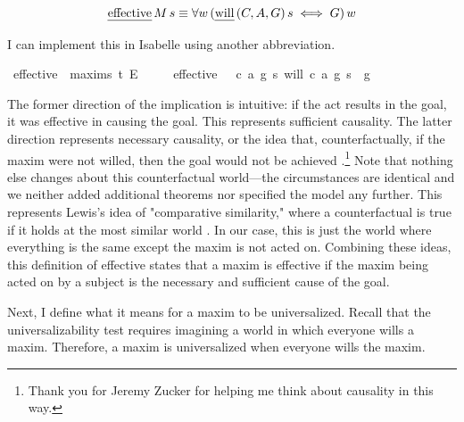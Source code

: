 \begin{isabellebody}
\begin{isamarkuptext}
\begin{definition}
$$\text{\emph{effective}} \, M \, s \equiv \forall w \, (\text{\emph{will}} \, (C, A, G) \, s \iff G) \, w$$

\end{definition}

I can implement this in Isabelle using another abbreviation.%
\end{isamarkuptext}\isamarkuptrue%
\isamarkupfalse%
\ effective\ {\isacharcolon}{\isacharcolon}\ {\isachardoublequoteopen}maxim{\isasymRightarrow}s{\isasymRightarrow}\ t{\isachardoublequoteclose}\ {\isacharparenleft}{\isachardoublequoteopen}E\ {\isacharunderscore}\ {\isacharunderscore}{\isachardoublequoteclose}{\isacharparenright}\isanewline
\ \ \ {\isachardoublequoteopen}effective\ \ {\isasymequiv}\ {\isasymlambda}{\isacharparenleft}c{\isacharcomma}\ a{\isacharcomma}\ g{\isacharparenright}\ s{\isachardot}\ {\isacharparenleft}{\isacharparenleft}will\ {\isacharparenleft}c{\isacharcomma}\ a{\isacharcomma}\ g{\isacharparenright}\ s{\isacharparenright}\ \isactrlbold {\isasymequiv}\ g{\isacharparenright}{\isachardoublequoteclose}\isanewline
%
%
\begin{isamarkuptext}%
The former direction of the implication is intuitive: if the act results in the goal, it was 
effective in causing the goal. This represents sufficient causality. The latter direction represents 
necessary causality, or the idea that, counterfactually, if the maxim were not willed, then the goal 
would not be achieved \citep{lewiscausality}.\footnote{Thank you for Jeremy Zucker for helping me 
think about causality in this way.}  Note that nothing else changes about this
counterfactual world—the circumstances are identical and we neither added additional theorems nor 
specified the model any further. This represents Lewis's idea of "comparative similarity,"  where 
a counterfactual is true if it holds at the most similar world \citep{lewiscounterfactuals}. 
In our case, this is just the world where everything is the same except the maxim is not acted on.
Combining these ideas, this definition of effective states that a maxim is effective if the 
maxim being acted on by a subject is the necessary and sufficient cause of the goal.

Next, I define what it means for a maxim to be universalized. Recall that the universalizability 
test requires imagining a world in which everyone wills a maxim. Therefore, a maxim is universalized
when everyone wills the maxim. 


\end{isamarkuptext}
\end{isabellebody}

